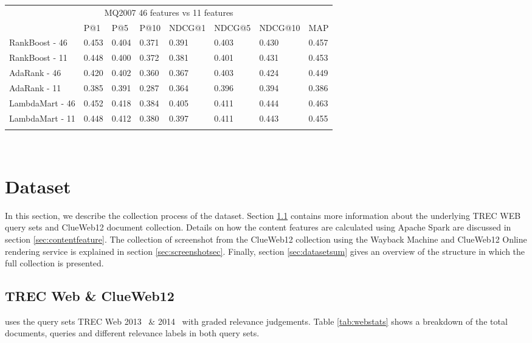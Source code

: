 
\begin{table}[t]
\begin{center}
\begin{tabular}{llllllll}
\multicolumn{8}{c}{MQ2007 46 features vs 11 features}                                     \\
           & P@1    & P@5    & P@10   & NDCG@1 & NDCG@5 & NDCG@10 & MAP    \\ \hline
RankBoost - 46  & 0.453 & 0.404 & 0.371 & 0.391 & 0.403 & 0.430  & 0.457 \\
RankBoost - 11 & 0.448 & 0.400 & 0.372 & 0.381  & 0.401  & 0.431   & 0.453 \\ \hline
AdaRank - 46  & 0.420 & 0.402 & 0.360 & 0.367 & 0.403 & 0.424  & 0.449 \\
AdaRank - 11  & 0.385 & 0.391 & 0.287 & 0.364  & 0.396  & 0.394   & 0.386 \\ \hline
LambdaMart - 46 & 0.452 & 0.418 & 0.384 & 0.405 & 0.411 & 0.444  & 0.463 \\
LambdaMart - 11 & 0.448 & 0.412 & 0.380 & 0.397  & 0.411  & 0.443   & 0.455 \\
\hline
\\
\end{tabular}
\\
\label{tab:11vs46}
\end{center}
\end{table}


\section{Dataset}\label{sec:dataset}
In this section, we describe the collection process of the \datasetname dataset. Section \ref{sec:trecclue} contains more information about the underlying TREC WEB query sets and ClueWeb12 document collection. Details on how the content features are calculated using Apache Spark are discussed in section \ref{sec:contentfeature}. The collection of screenshot from the ClueWeb12 collection using the Wayback Machine and ClueWeb12 Online rendering service is explained in section \ref{sec:screenshotsec}. Finally, section \ref{sec:datasetsum} gives an overview of the structure in which the full collection is presented.

\subsection{TREC Web \& ClueWeb12 }\label{sec:trecclue}
\datasetname uses the query sets TREC Web 2013~\cite{collins2013trec} \& 2014~\cite{collins2015trec} with graded relevance judgements. Table \ref{tab:webstats} shows a breakdown of the total documents, queries and different relevance labels in both query sets. 

